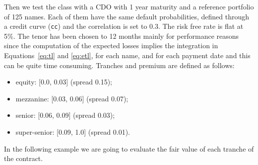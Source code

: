 Then we test the class with a CDO with 1 year maturity and a reference portfolio of 125 names. Each of them have the same default probabilities, defined through a credit curve (\texttt{cc}) and the correlation is set to 0.3. The risk free rate is flat at 5\%. The tenor has been chosen to 12 months mainly for performance reasons since the computation of the expected losses implies the integration in Equations~\ref{eq:tl} and \ref{eq:etl}, for each name, and for each payment date and this can be quite time consuming.
Tranches and premium are defined as follows:
\begin{itemize}
	\item equity: [0.0, 0.03] (spread 0.15);
	\item mezzanine: [0.03, 0.06] (spread 0.07);
	\item senior: [0.06, 0.09] (spread 0.03);
	\item super-senior: [0.09, 1.0] (spread 0.01).
\end{itemize}

In the following example we are going to evaluate the fair value of each tranche of the contract.


